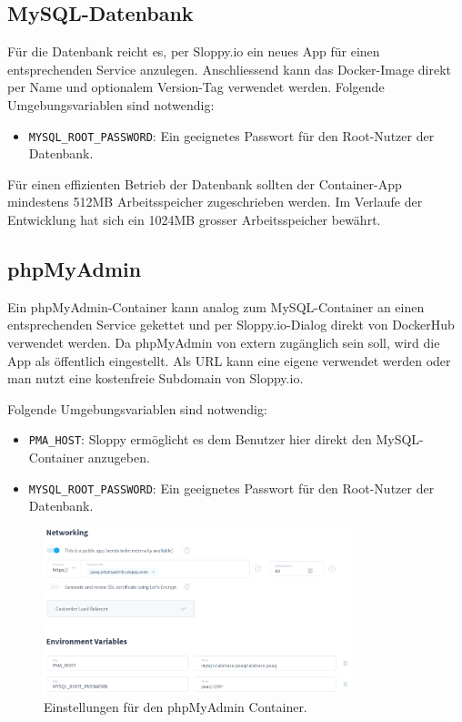 \documentclass[../main.tex]{subfiles}
\begin{document}
	\subsection{MySQL-Datenbank}
	\par Für die Datenbank reicht es, per Sloppy.io ein neues App für einen entsprechenden Service anzulegen. Anschliessend kann das Docker-Image direkt per Name und optionalem Version-Tag verwendet werden. Folgende Umgebungsvariablen sind notwendig:
	\begin{itemize}
		\item \texttt{MYSQL\_ROOT\_PASSWORD}: Ein geeignetes Passwort für den Root-Nutzer der Datenbank.
	\end{itemize}
	\par Für einen effizienten Betrieb der Datenbank sollten der Container-App mindestens 512MB Arbeitsspeicher zugeschrieben werden. Im Verlaufe der Entwicklung hat sich ein 1024MB grosser Arbeitsspeicher bewährt.
	
	\subsection{phpMyAdmin}
	\par Ein phpMyAdmin-Container kann analog zum MySQL-Container an einen entsprechenden Service gekettet und per Sloppy.io-Dialog direkt von DockerHub verwendet werden. Da phpMyAdmin von extern zugänglich sein soll, wird die App als öffentlich eingestellt. Als URL kann eine eigene verwendet werden oder man nutzt eine kostenfreie Subdomain von Sloppy.io. 
	\par Folgende Umgebungsvariablen sind notwendig:
	\begin{itemize}
		\item \texttt{PMA\_HOST}: Sloppy ermöglicht es dem Benutzer hier direkt den MySQL-Container anzugeben.
		\item \texttt{MYSQL\_ROOT\_PASSWORD}: Ein geeignetes Passwort für den Root-Nutzer der Datenbank.
	\end{itemize}
	
	\begin{figure}[H]
		\centering
		\includegraphics[width=0.8\textwidth]{../images/SloppyPHPPreferences} 
		\caption{Einstellungen für den phpMyAdmin Container.}
		\label{fig:SloppyPHPPreferences}
	\end{figure}
	
\end{document}
